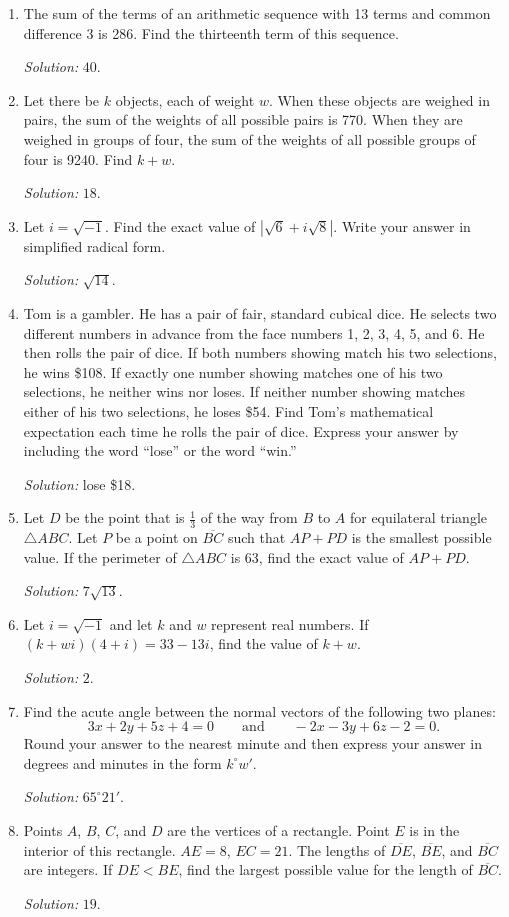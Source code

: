 \documentclass[11pt]{article}
\begin{document}
\begin{enumerate}[label=\textbf{\arabic*.}]
\item The sum of the terms of an arithmetic sequence with 13 terms and common difference 3 is 286. Find the thirteenth term of this sequence.\par\textit{Solution: }$40$.

\item Let there be $k$ objects, each of weight $w$. When these objects are weighed in pairs, the sum of the weights of all possible pairs is 770. When they are weighed in groups of four, the sum of the weights of all possible groups of four is 9240. Find $k+w$.\par\textit{Solution: }$18$.

\item Let $i=\sqrt{-1}$. Find the exact value of $\left|\sqrt6+i\sqrt8\right|$. Write your answer in simplified radical form.\par\textit{Solution: }$\sqrt{14}$.

\item Tom is a gambler. He has a pair of fair, standard cubical dice. He selects two different numbers in advance from the face numbers 1, 2, 3, 4, 5, and 6. He then rolls the pair of dice. If both numbers showing match his two selections, he wins \$108. If exactly one number showing matches one of his two selections, he neither wins nor loses. If neither number showing matches either of his two selections, he loses \$54. Find Tom's mathematical expectation each time he rolls the pair of dice. Express your answer by including the word ``lose'' or the word ``win.''\par\textit{Solution: }lose \$18.

\item Let $D$ be the point that is $\frac13$ of the way from $B$ to $A$ for equilateral triangle $\triangle ABC$. Let $P$ be a point on $\overline{BC}$ such that $AP+PD$ is the smallest possible value. If the perimeter of $\triangle ABC$ is 63, find the exact value of $AP+PD$.\par\textit{Solution: }$7\sqrt{13}$.

\item Let $i=\sqrt{-1}$ and let $k$ and $w$ represent real numbers. If $(k+wi)(4+i)=33-13i$, find the value of $k+w$.\par\textit{Solution: }$2$.

\item Find the acute angle between the normal vectors of the following two planes:
\[
3x+2y+5z+4=0\qquad\text{and}\qquad -2x-3y+6z-2=0.
\]
Round your answer to the nearest minute and then express your answer in degrees and minutes in the form $k^\circ w'$.\par\textit{Solution: }$65^\circ21'$.

\item Points $A$, $B$, $C$, and $D$ are the vertices of a rectangle. Point $E$ is in the interior of this rectangle. $AE=8$, $EC=21$. The lengths of $\overline{DE}$, $\overline{BE}$, and $\overline{BC}$ are integers. If $DE<BE$, find the largest possible value for the length of $\overline{BC}$.\par\textit{Solution: }$19$.
\end{enumerate}
\end{document}
